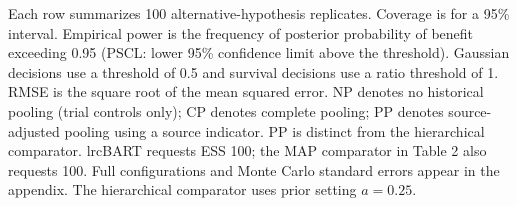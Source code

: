 \noindent\begin{minipage}{\linewidth}\footnotesize Each row summarizes 100 alternative-hypothesis replicates. Coverage is for a 95\% interval. Empirical power is the frequency of posterior probability of benefit exceeding 0.95 (PSCL: lower 95\% confidence limit above the threshold). Gaussian decisions use a threshold of 0.5 and survival decisions use a ratio threshold of 1. RMSE is the square root of the mean squared error. NP denotes no historical pooling (trial controls only); CP denotes complete pooling; PP denotes source-adjusted pooling using a source indicator. PP is distinct from the hierarchical comparator. lrcBART requests ESS 100; the MAP comparator in Table 2 also requests 100. Full configurations and Monte Carlo standard errors appear in the appendix. The hierarchical comparator uses prior setting $a=0.25$.\end{minipage}
\endgroup
